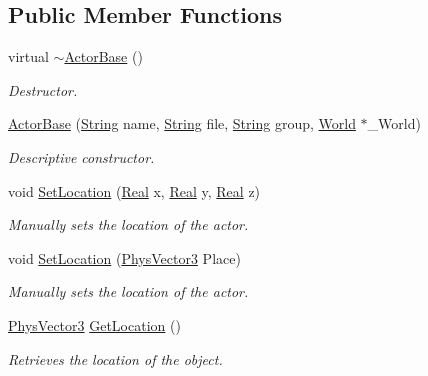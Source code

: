 \subsection*{Public Member Functions}
\begin{DoxyCompactItemize}
\item 
virtual \hyperlink{classphys_1_1ActorBase_a5e5d4b50c83c6851e554b5e7ad65403f}{$\sim$ActorBase} ()
\begin{DoxyCompactList}\small\item\em Destructor. \item\end{DoxyCompactList}\item 
\hyperlink{classphys_1_1ActorBase_ad9d90a68921ce81653e9950c1330809d}{ActorBase} (\hyperlink{namespacephys_aa03900411993de7fbfec4789bc1d392e}{String} name, \hyperlink{namespacephys_aa03900411993de7fbfec4789bc1d392e}{String} file, \hyperlink{namespacephys_aa03900411993de7fbfec4789bc1d392e}{String} group, \hyperlink{classphys_1_1World}{World} $\ast$\_\-World)
\begin{DoxyCompactList}\small\item\em Descriptive constructor. \item\end{DoxyCompactList}\item 
void \hyperlink{classphys_1_1ActorBase_a0b0db2ec0f4926326635b86f1ead2276}{SetLocation} (\hyperlink{namespacephys_af7eb897198d265b8e868f45240230d5f}{Real} x, \hyperlink{namespacephys_af7eb897198d265b8e868f45240230d5f}{Real} y, \hyperlink{namespacephys_af7eb897198d265b8e868f45240230d5f}{Real} z)
\begin{DoxyCompactList}\small\item\em Manually sets the location of the actor. \item\end{DoxyCompactList}\item 
void \hyperlink{classphys_1_1ActorBase_a9a182b7262742ab5d499e7a51d407044}{SetLocation} (\hyperlink{classPhysVector3}{PhysVector3} Place)
\begin{DoxyCompactList}\small\item\em Manually sets the location of the actor. \item\end{DoxyCompactList}\item 
\hyperlink{classPhysVector3}{PhysVector3} \hyperlink{classphys_1_1ActorBase_ae402982d8c62acac7a122f24a289731d}{GetLocation} ()
\begin{DoxyCompactList}\small\item\em Retrieves the location of the object. \item\end{DoxyCompactList}\item 

\end{DoxyCompactItemize}
